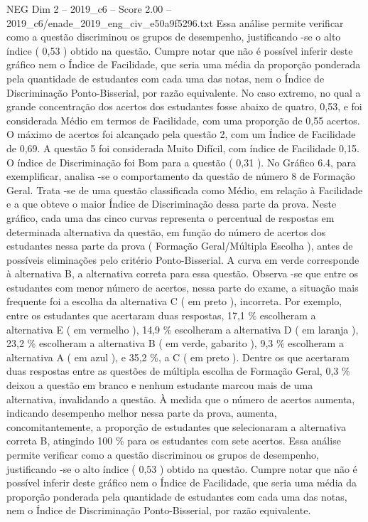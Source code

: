 \begin{textsample}{NEG Dim 2 – 2019\_c6 – Score 2.00 – 2019\_c6/enade\_2019\_eng\_civ\_e50a9f5296.txt}
Essa análise permite verificar como a questão discriminou os grupos de desempenho, justificando -se o alto índice ( 0,53 ) obtido na questão.
Cumpre notar que não é possível inferir deste gráfico nem o Índice de Facilidade, que seria uma média da proporção ponderada pela quantidade de estudantes com cada uma das notas, nem o Índice de Discriminação Ponto-Bisserial, por razão equivalente.
No caso extremo, no qual a grande concentração dos acertos dos estudantes fosse abaixo de quatro, 0,53, e foi considerada Médio em termos de Facilidade, com uma proporção de 0,55 acertos.
O máximo de acertos foi alcançado pela questão 2, com um Índice de Facilidade de 0,69.
A questão 5 foi considerada Muito Difícil, com índice de Facilidade 0,15.
O índice de Discriminação foi Bom para a questão ( 0,31 ).
No Gráfico 6.4, para exemplificar, analisa -se o comportamento da questão de número 8 de Formação Geral.
Trata -se de uma questão classificada como Médio, em relação à Facilidade e a que obteve o maior Índice de Discriminação dessa parte da prova.
Neste gráfico, cada uma das cinco curvas representa o percentual de respostas em determinada alternativa da questão, em função do número de acertos dos estudantes nessa parte da prova ( Formação Geral/Múltipla Escolha ), antes de possíveis eliminações pelo critério Ponto-Bisserial.
A curva em verde corresponde à alternativa B, a alternativa correta para essa questão.
Observa -se que entre os estudantes com menor número de acertos, nessa parte do exame, a situação mais frequente foi a escolha da alternativa C ( em preto ), incorreta.
Por exemplo, entre os estudantes que acertaram duas respostas, 17,1 \% escolheram a alternativa E ( em vermelho ), 14,9 \% escolheram a alternativa D ( em laranja ), 23,2 \% escolheram a alternativa B ( em verde, gabarito ), 9,3 \% escolheram a alternativa A ( em azul ), e 35,2 \%, a C ( em preto ).
Dentre os que acertaram duas respostas entre as questões de múltipla escolha de Formação Geral, 0,3 \% deixou a questão em branco e nenhum estudante marcou mais de uma alternativa, invalidando a questão.
À medida que o número de acertos aumenta, indicando desempenho melhor nessa parte da prova, aumenta, concomitantemente, a proporção de estudantes que selecionaram a alternativa correta B, atingindo 100 \% para os estudantes com sete acertos.
Essa análise permite verificar como a questão discriminou os grupos de desempenho, justificando -se o alto índice ( 0,53 ) obtido na questão.
Cumpre notar que não é possível inferir deste gráfico nem o Índice de Facilidade, que seria uma média da proporção ponderada pela quantidade de estudantes com cada uma das notas, nem o Índice de Discriminação Ponto-Bisserial, por razão equivalente.

\end{textsample}
